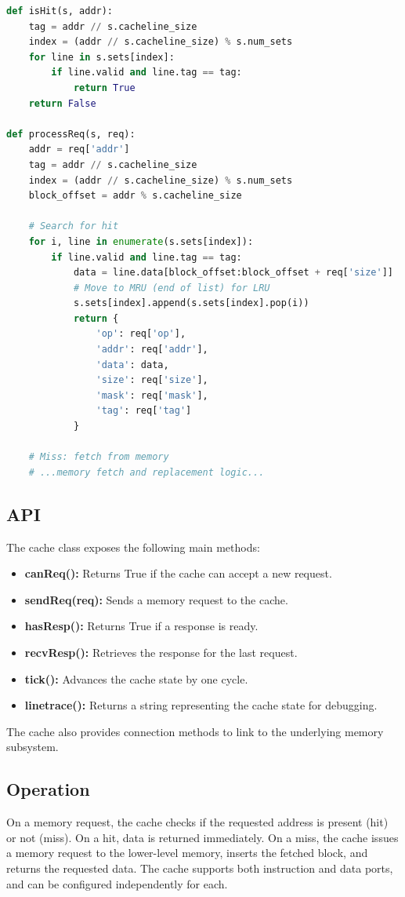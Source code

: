 \documentclass[12pt,a4paper]{report}
\begin{document}
\begin{lstlisting}[language=Python]
def isHit(s, addr):
    tag = addr // s.cacheline_size
    index = (addr // s.cacheline_size) % s.num_sets
    for line in s.sets[index]:
        if line.valid and line.tag == tag:
            return True
    return False

def processReq(s, req):
    addr = req['addr']
    tag = addr // s.cacheline_size
    index = (addr // s.cacheline_size) % s.num_sets
    block_offset = addr % s.cacheline_size

    # Search for hit
    for i, line in enumerate(s.sets[index]):
        if line.valid and line.tag == tag:
            data = line.data[block_offset:block_offset + req['size']]
            # Move to MRU (end of list) for LRU
            s.sets[index].append(s.sets[index].pop(i))
            return {
                'op': req['op'],
                'addr': req['addr'],
                'data': data,
                'size': req['size'],
                'mask': req['mask'],
                'tag': req['tag']
            }

    # Miss: fetch from memory
    # ...memory fetch and replacement logic...
\end{lstlisting}

\subsection{API}
The cache class exposes the following main methods:
\begin{itemize}
  \item \textbf{canReq():} Returns True if the cache can accept a new request.
  \item \textbf{sendReq(req):} Sends a memory request to the cache.
  \item \textbf{hasResp():} Returns True if a response is ready.
  \item \textbf{recvResp():} Retrieves the response for the last request.
  \item \textbf{tick():} Advances the cache state by one cycle.
  \item \textbf{linetrace():} Returns a string representing the cache state for debugging.
\end{itemize}
The cache also provides connection methods to link to the underlying memory subsystem.

\subsection{Operation}
On a memory request, the cache checks if the requested address is present (hit) or not (miss). On a hit, data is returned immediately. On a miss, the cache issues a memory request to the lower-level memory, inserts the fetched block, and returns the requested data. The cache supports both instruction and data ports, and can be configured independently for each.
\end{document}
